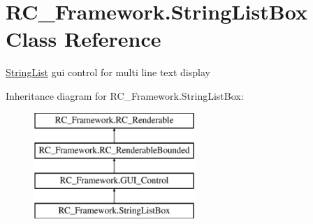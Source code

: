 \hypertarget{class_r_c___framework_1_1_string_list_box}{}\section{R\+C\+\_\+\+Framework.\+String\+List\+Box Class Reference}
\label{class_r_c___framework_1_1_string_list_box}


\mbox{\hyperlink{class_r_c___framework_1_1_string_list}{String\+List}} gui control for multi line text display  


Inheritance diagram for R\+C\+\_\+\+Framework.\+String\+List\+Box\+:\begin{figure}[H]
\begin{center}
\leavevmode
\includegraphics[height=4.000000cm]{class_r_c___framework_1_1_string_list_box}
\end{center}
\end{figure}
